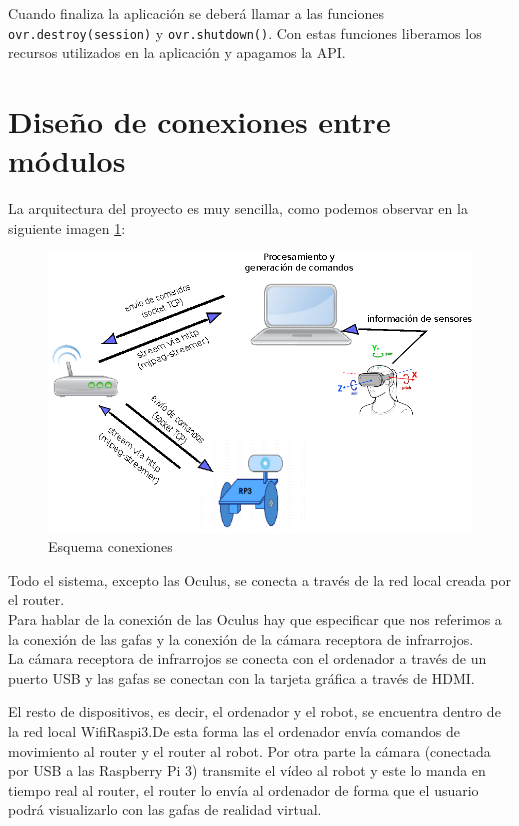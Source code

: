 \documentclass[twoside, 11pt]{epstfg}
\begin{document}
Cuando finaliza la aplicación se deberá llamar a las funciones \texttt{ovr.destroy(session)} y \texttt{ovr.shutdown()}. Con estas funciones liberamos los recursos utilizados en la aplicación y apagamos la API.

\section{Diseño de conexiones entre módulos}

La arquitectura del proyecto es muy sencilla, como podemos observar en la siguiente imagen \ref{Fig::EsquemaConexiones}:

\begin{figure}[h]
	\centerline{
		\mbox{\includegraphics[width=.80\textwidth]{images/disConex2.eps}}
	}
	\caption{Esquema conexiones}
	\label{Fig::EsquemaConexiones}
\end{figure}


Todo el sistema, excepto las Oculus, se conecta a través de la red local creada por el router.\\
Para hablar de la conexión de las Oculus hay que especificar que nos referimos a la conexión de las gafas y la conexión de la cámara receptora de infrarrojos.\\
La cámara receptora de infrarrojos se conecta con el ordenador a través de un puerto USB y las gafas se conectan con la tarjeta gráfica a través de HDMI.

El resto de dispositivos, es decir, el ordenador y el robot, se encuentra dentro de la red local WifiRaspi3.De esta forma las el ordenador envía comandos de movimiento al router y el router al robot. Por otra parte la cámara (conectada por USB a las Raspberry Pi 3) transmite el vídeo al robot y este lo manda en tiempo real al router, el router lo envía al ordenador de forma que el usuario podrá visualizarlo con las gafas de realidad virtual.
\end{document}
